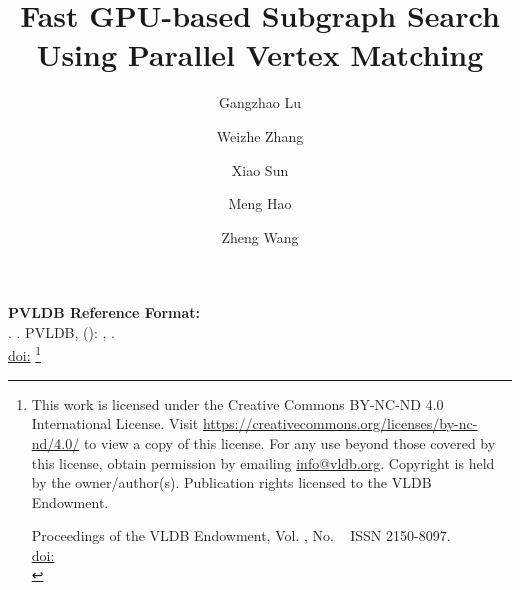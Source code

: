 \documentclass[sigconf, nonacm]{acmart}
\begin{document}
\title{Fast GPU-based Subgraph Search Using Parallel Vertex Matching}

\author{Gangzhao Lu}

\author{Weizhe Zhang}

\author{Xiao Sun}

\author{Meng Hao}
 

\author{Zheng Wang}




\maketitle
\pagestyle{\vldbpagestyle}
\begingroup\small\noindent\raggedright\textbf{PVLDB Reference Format:}\\
\vldbauthors. \vldbtitle. PVLDB, \vldbvolume(\vldbissue): \vldbpages, \vldbyear.\\
\href{https://doi.org/\vldbdoi}{doi:\vldbdoi}
\endgroup
\begingroup
\renewcommand\thefootnote{}\footnote{\noindent
This work is licensed under the Creative Commons BY-NC-ND 4.0 International License. Visit \url{https://creativecommons.org/licenses/by-nc-nd/4.0/} to view a copy of this license. For any use beyond those covered by this license, obtain permission by emailing \href{mailto:info@vldb.org}{info@vldb.org}. Copyright is held by the owner/author(s). Publication rights licensed to the VLDB Endowment. \\
\raggedright Proceedings of the VLDB Endowment, Vol. \vldbvolume, No. \vldbissue\ %
ISSN 2150-8097. \\
\href{https://doi.org/\vldbdoi}{doi:\vldbdoi} \\
}\addtocounter{footnote}{-1}\endgroup














\balance

\end{document}
